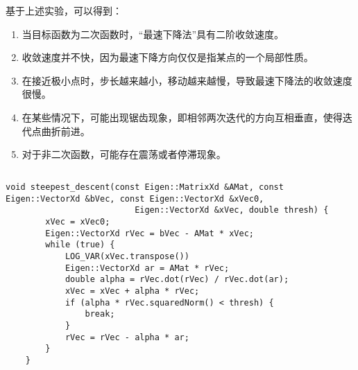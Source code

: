 \documentclass[12pt, onecolumn]{article}
\newcommand\normf{\fangsong}
\begin{document}
		
		基于上述实验，可以得到：
		\begin{enumerate}
		\item 当目标函数为二次函数时，“最速下降法”具有二阶收敛速度。
		
		\item 收敛速度并不快，因为最速下降方向仅仅是指某点的一个局部性质。
		
		\item 在接近极小点时，步长越来越小，移动越来越慢，导致最速下降法的收敛速度很慢。
		
		\item 在某些情况下，可能出现锯齿现象，即相邻两次迭代的方向互相垂直，使得迭代点曲折前进。
		
		\item 对于非二次函数，可能存在震荡或者停滞现象。
		\end{enumerate}
	
	\subsection{\normf{关键代码}}
	\begin{lstlisting}[caption=\normf{最速下降法代码}]
    void steepest_descent(const Eigen::MatrixXd &AMat, const Eigen::VectorXd &bVec, const Eigen::VectorXd &xVec0,
                          Eigen::VectorXd &xVec, double thresh) {
        xVec = xVec0;
        Eigen::VectorXd rVec = bVec - AMat * xVec;
        while (true) {
            LOG_VAR(xVec.transpose())
            Eigen::VectorXd ar = AMat * rVec;
            double alpha = rVec.dot(rVec) / rVec.dot(ar);
            xVec = xVec + alpha * rVec;
            if (alpha * rVec.squaredNorm() < thresh) {
                break;
            }
            rVec = rVec - alpha * ar;
        }
    }
	\end{lstlisting}
	
	\newpage
	\section{\normf{共轭梯度下降}}
\end{document}
